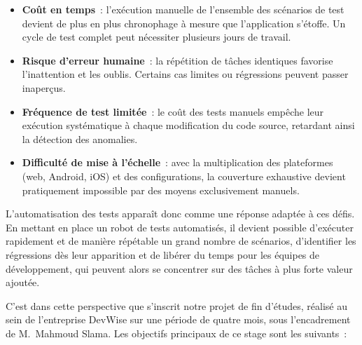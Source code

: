 \begin{itemize}
  \item \textbf{Co\^{u}t en temps}~: l'ex\'{e}cution manuelle de l'ensemble des
    sc\'{e}narios de test devient de plus en plus chronophage \`{a} mesure que
    l'application s'\'{e}toffe. Un cycle de test complet peut n\'{e}cessiter
    plusieurs jours de travail.

  \item \textbf{Risque d'erreur humaine}~: la r\'{e}p\'{e}tition de t\^{a}ches
    identiques favorise l'inattention et les oublis. Certains cas limites
    ou r\'{e}gressions peuvent passer inaper\c{c}us.

  \item \textbf{Fr\'{e}quence de test limit\'{e}e}~: le co\^{u}t des tests manuels
    emp\^{e}che leur ex\'{e}cution syst\'{e}matique \`{a} chaque modification du code
    source, retardant ainsi la d\'{e}tection des anomalies.

  \item \textbf{Difficult\'{e} de mise \`{a} l'\'{e}chelle}~: avec la multiplication
    des plateformes (web, Android, iOS) et des configurations, la
    couverture exhaustive devient pratiquement impossible par des moyens
    exclusivement manuels.
\end{itemize}

L'automatisation des tests appara\^{i}t donc comme une r\'{e}ponse adapt\'{e}e \`{a}
ces d\'{e}fis. En mettant en place un robot de tests automatis\'{e}s, il devient
possible d'ex\'{e}cuter rapidement et de mani\`{e}re r\'{e}p\'{e}table un grand nombre de
sc\'{e}narios, d'identifier les r\'{e}gressions d\`{e}s leur apparition et de
lib\'{e}rer du temps pour les \'{e}quipes de d\'{e}veloppement, qui peuvent alors se
concentrer sur des t\^{a}ches \`{a} plus forte valeur ajout\'{e}e.

\vspace{0.3cm}


C'est dans cette perspective que s'inscrit notre projet de fin d'\'{e}tudes,
r\'{e}alis\'{e} au sein de l'entreprise DevWise sur une p\'{e}riode de quatre mois,
sous l'encadrement de M.~Mahmoud Slama. Les objectifs principaux de ce
stage sont les suivants~:

